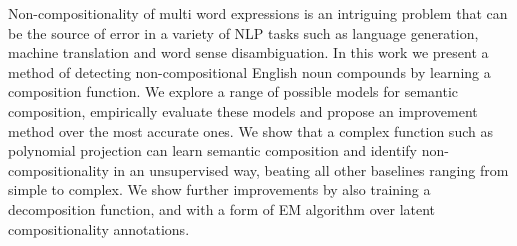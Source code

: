 Non-compositionality of multi word expressions is an intriguing problem that can be the source of error in a variety of NLP tasks such as language generation, machine translation and word sense disambiguation. In this work we present a method of detecting non-compositional English noun compounds by learning a composition function. We explore a range of possible models for semantic composition, empirically evaluate these models and propose an improvement method over the most accurate ones. We show that a complex function such as polynomial projection can learn semantic composition and identify non-compositionality in an unsupervised way, beating all other baselines ranging from simple to complex. We show further improvements by also training a decomposition function, and with a form of EM algorithm over latent compositionality annotations.
